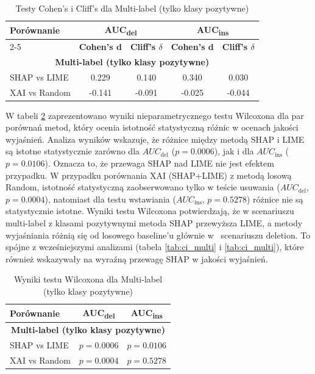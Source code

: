 \documentclass[wmii, inf, mgr]{uwmthesis}
\begin{document}
\begin{table}[H]
	\centering
	\renewcommand{\arraystretch}{1.3}
	\begin{tabular}{|l|c|c|c|c|}
		\hline
		\textbf{Porównanie} & \multicolumn{2}{c|}{\textbf{AUC\textsubscript{del}}} & \multicolumn{2}{c|}{\textbf{AUC\textsubscript{ins}}} \\ \cline{2-5}
		& \textbf{Cohen's d} & \textbf{Cliff's $\delta$} & \textbf{Cohen's d} & \textbf{Cliff's $\delta$} \\ \hline
		\multicolumn{5}{|c|}{\textbf{Multi-label (tylko klasy pozytywne)}} \\ \hline
		SHAP vs LIME   & 0.229 & 0.140 & 0.340 & 0.030 \\ \hline
		XAI vs Random  & -0.141 & -0.091 & -0.025 & -0.044 \\ \hline
	\end{tabular}
	\caption{Testy Cohen's i Cliff's dla Multi-label (tylko klasy pozytywne)}
	\label{tab:tests_multi}
\end{table}


W tabeli \ref{tab:wilcoxon_multi} zaprezentowano wyniki nieparametrycznego testu Wilcoxona dla par porównań metod, który ocenia istotność statystyczną różnic w ocenach jakości wyjaśnień. Analiza wyników wskazuje, że różnice między metodą SHAP i LIME są istotne statystycznie zarówno dla $AUC_{\text{del}}$ ($p = 0.0006$), jak i dla $AUC_{\text{ins}}$ ($p = 0.0106$). Oznacza to, że przewaga SHAP nad LIME nie jest efektem przypadku. W przypadku porównania XAI (SHAP+LIME) z metodą losową Random, istotność statystyczną zaobserwowano tylko w teście usuwania ($AUC_{\text{del}}$, $p = 0.0004$), natomiast dla testu wstawiania ($AUC_{\text{ins}}$, $p = 0.5278$) różnice nie są statystycznie istotne. Wyniki testu Wilcoxona potwierdzają, że w scenariuszu multi-label z klasami pozytywnymi metoda SHAP przewyższa LIME, a metody wyjaśniania różnią się od losowego baseline’u głównie w~ scenariuszu deletion. To spójne z wcześniejszymi analizami (tabela \ref{tab:ci_multi} i \ref{tab:ci_multi}), które również wskazywały na wyraźną przewagę SHAP w jakości wyjaśnień.

\begin{table}[H]
	\centering
	\renewcommand{\arraystretch}{1.3}
	\begin{tabular}{|l|c|c|}
		\hline
		\textbf{Porównanie} & \textbf{AUC\textsubscript{del}} & \textbf{AUC\textsubscript{ins}} \\ \hline
		\multicolumn{3}{|c|}{\textbf{Multi-label (tylko klasy pozytywne)}} \\ \hline
		SHAP vs LIME  & $p=0.0006$ & $p=0.0106$ \\ \hline
		XAI vs Random & $p=0.0004$ & $p=0.5278$ \\ \hline
	\end{tabular}
	\caption{Wyniki testu Wilcoxona dla Multi-label (tylko klasy pozytywne)}
	\label{tab:wilcoxon_multi}
\end{table}
\end{document}
